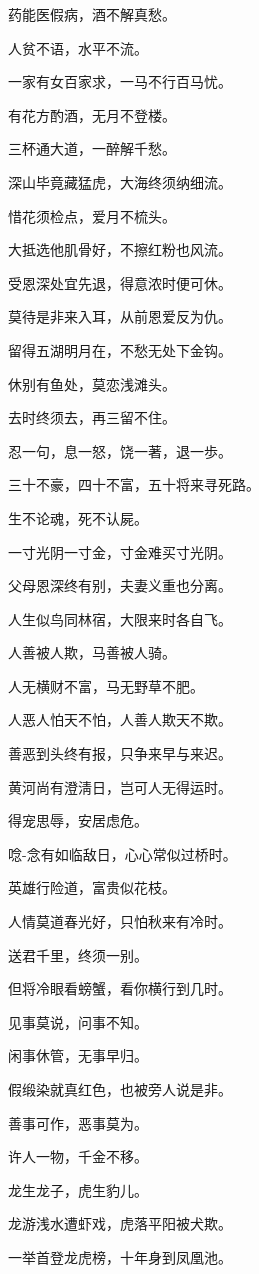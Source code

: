 \documentclass[12pt,oneside]{book}
\begin{document}
药能医假病，酒不解真愁。

人贫不语，水平不流。

一家有女百家求，一马不行百马忧。

有花方酌酒，无月不登楼。

三杯通大道，一醉解千愁。

深山毕竟藏猛虎，大海终须纳细流。

惜花须检点，爱月不梳头。

大抵选他肌骨好，不擦红粉也风流。

受恩深处宜先退，得意浓时便可休。

莫待是非来入耳，从前恩爱反为仇。

留得五湖明月在，不愁无处下金钩。

休别有鱼处，莫恋浅滩头。

去时终须去，再三留不住。

忍一句，息一怒，饶一著，退一歩。

三十不豪，四十不富，五十将来寻死路。

生不论魂，死不认屍。

一寸光阴一寸金，寸金难买寸光阴。

父母恩深终有别，夫妻义重也分离。

人生似鸟同林宿，大限来时各自飞。

人善被人欺，马善被人骑。

人无横财不富，马无野草不肥。

人恶人怕天不怕，人善人欺天不欺。

善恶到头终有报，只争来早与来迟。

黄河尚有澄淸日，岂可人无得运时。

得宠思辱，安居虑危。

唸-{念}有如临敌日，心心常似过桥时。

英雄行险道，富贵似花枝。

人情莫道春光好，只怕秋来有冷时。

送君千里，终须一别。

但将冷眼看螃蟹，看你横行到几时。

见事莫说，问事不知。

闲事休管，无事早归。

假缎染就真红色，也被旁人说是非。

善事可作，恶事莫为。

许人一物，千金不移。

龙生龙子，虎生豹儿。

龙游浅水遭虾戏，虎落平阳被犬欺。

一举首登龙虎榜，十年身到凤凰池。
\end{document}
